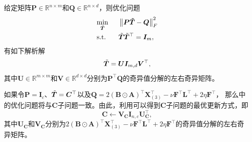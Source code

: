 \begin{lemma}\kaishu
\label{lemma:quad}
给定矩阵$\boldsymbol{P} \in \mathbb{R}^{n \times m}$和$\boldsymbol{Q} \in \mathbb{R}^{n \times d}$，则优化问题
\begin{equation*}
    \begin{aligned}
&\underset{\mathclap{\Tilde{\boldsymbol{T}}}}{\min} \Hquad&&\left\|\boldsymbol{P}\boldsymbol{\Tilde{T}}-\boldsymbol{Q}\right\|_{F}^{2}\\
&\text{s.t.} && \Tilde{\boldsymbol{T}}\Tilde{\boldsymbol{T}}^{\top} = \boldsymbol{I}_{m},
\end{aligned}
\end{equation*}
有如下解析解
\begin{equation*}
    \Tilde{\boldsymbol{T}}=\boldsymbol{U}\boldsymbol{I}_{m,d}\boldsymbol{V}^{\top},
\end{equation*}
其中$\boldsymbol{U} \in \mathbb{R}^{m \times m}$和$\boldsymbol{V} \in \mathbb{R}^{d \times d}$分别为$\boldsymbol{P}^{\top}\boldsymbol{Q}$的奇异值分解的左右奇异矩阵。
\end{lemma}
\noindent 如果令$\boldsymbol{P}=\boldsymbol{I}_{c}$、$\Tilde{\boldsymbol{T}}=\boldsymbol{C}^{\top}$以及$\boldsymbol{Q}=2(\boldsymbol{B}\odot\boldsymbol{A})^{\top}\boldsymbol{X}_{(3)}^{\top}-\nu\boldsymbol{F}^{\top}\boldsymbol{L}^{\top} + 2\eta\boldsymbol{F}^{\top}$，
那么中的优化问题将与$\boldsymbol{C}$子问题一致。由此，利用可以得到$\boldsymbol{C}$子问题的最优更新方式，即
\begin{equation*}
    \boldsymbol{C} \leftarrow \boldsymbol{V}_{\boldsymbol{C}}\boldsymbol{I}_{n,c}\boldsymbol{U}_{\boldsymbol{C}}^{\top},
\end{equation*}
其中$\boldsymbol{U}_{\boldsymbol{C}}$和$\boldsymbol{V}_{\boldsymbol{C}}$分别为$2(\boldsymbol{B}\odot\boldsymbol{A})^{\top}\boldsymbol{X}_{(3)}^{\top}-\nu\boldsymbol{F}^{\top}\boldsymbol{L}^{\top} + 2\eta\boldsymbol{F}^{\top}$的奇异值分解的左右奇异矩阵。

